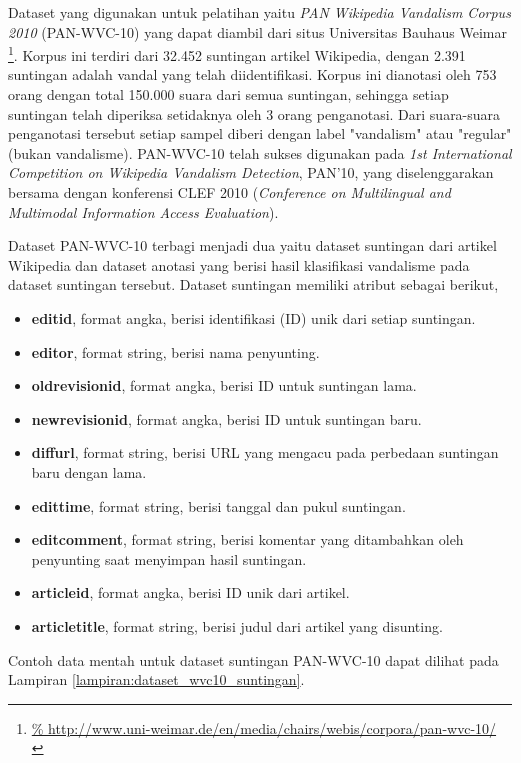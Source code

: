 Dataset yang digunakan untuk pelatihan yaitu \textit{PAN Wikipedia Vandalism
Corpus 2010} (PAN-WVC-10)
\parencite{potthast:2010b}
yang dapat diambil dari situs Universitas Bauhaus Weimar
\footnote{%
	\RaggedRight\url{%
http://www.uni-weimar.de/en/media/chairs/webis/corpora/pan-wvc-10/
}}.
Korpus ini terdiri dari 32.452 suntingan artikel Wikipedia, dengan 2.391
suntingan adalah vandal yang telah diidentifikasi.
Korpus ini dianotasi oleh 753 orang dengan total 150.000 suara dari semua
suntingan, sehingga setiap suntingan telah diperiksa setidaknya oleh 3 orang
penganotasi.
Dari suara-suara penganotasi tersebut setiap sampel diberi dengan label
"vandalism" atau "regular" (bukan vandalisme).
PAN-WVC-10 telah sukses digunakan pada \textit{1st International Competition on
Wikipedia Vandalism Detection}, PAN'10, yang diselenggarakan bersama dengan
konferensi CLEF 2010 (\textit{Conference on Multilingual and Multimodal
Information Access Evaluation}).

Dataset PAN-WVC-10 terbagi menjadi dua yaitu dataset suntingan dari artikel
Wikipedia dan dataset anotasi yang berisi hasil klasifikasi vandalisme pada
dataset suntingan tersebut.
Dataset suntingan memiliki atribut sebagai berikut,

\begin{itemize}
	\item \textbf{editid}, format angka, berisi identifikasi (ID) unik dari setiap suntingan.
	\item \textbf{editor}, format string, berisi nama penyunting.
	\item \textbf{oldrevisionid}, format angka, berisi ID untuk suntingan lama.
	\item \textbf{newrevisionid}, format angka, berisi ID untuk suntingan baru.
	\item \textbf{diffurl}, format string, berisi URL yang mengacu pada perbedaan suntingan baru dengan lama.
	\item \textbf{edittime}, format string, berisi tanggal dan pukul
	suntingan.
	\item \textbf{editcomment}, format string, berisi komentar yang ditambahkan oleh penyunting saat menyimpan hasil suntingan.
	\item \textbf{articleid}, format angka, berisi ID unik dari artikel.
	\item \textbf{articletitle}, format string, berisi judul dari artikel yang disunting.
\end{itemize}

Contoh data mentah untuk dataset suntingan PAN-WVC-10 dapat dilihat pada
Lampiran \ref{lampiran:dataset_wvc10_suntingan}.

